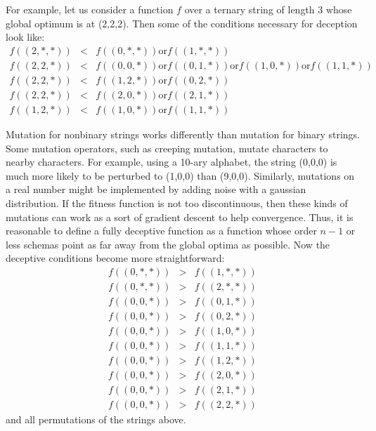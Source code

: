 For example, let us consider a function $f$ over a ternary string of length
3 whose global optimum is at (2,2,2).  Then some of the conditions necessary
for deception look like:
\begin{eqnarray}
f((2,*,*)) &<& f((0,*,*)) \mbox{or} f((1,*,*)) \nonumber\\
f((2,2,*)) &<& f((0,0,*)) \mbox{or} f((0,1,*)) \mbox{or} f((1,0,*)) \mbox{or} f((1,1,*)) \nonumber\\
f((2,2,*)) &<& f((1,2,*)) \mbox{or} f((0,2,*)) \nonumber \\
f((2,2,*)) &<& f((2,0,*)) \mbox{or} f((2,1,*)) \nonumber \\
f((1,2,*)) &<& f((1,0,*)) \mbox{or} f((1,1,*))
\end{eqnarray}

Mutation for nonbinary strings works differently than mutation for binary
strings.  Some mutation operators, such as creeping mutation, mutate
characters to nearby characters.  For example, using a 10-ary alphabet,
the string (0,0,0) is much more likely to be perturbed to (1,0,0) than (9,0,0).
Similarly, mutations on a real number might be implemented by adding noise
with a gaussian distribution.  If the fitness function is not too
discontinuous, then these kinds of mutations can work as a sort of gradient
descent to help convergence.  Thus, it is reasonable to define a fully
deceptive function as a function whose order $n-1$ or less schemas point as far
away from the global optima as possible.  Now the deceptive conditions
become more straightforward:
\begin{eqnarray}
f((0,*,*)) &>& f((1,*,*)) \nonumber\\
f((0,*,*)) &>& f((2,*,*)) \nonumber\\
f((0,0,*)) &>& f((0,1,*)) \nonumber\\ 
f((0,0,*)) &>& f((0,2,*)) \nonumber\\ 
f((0,0,*)) &>& f((1,0,*)) \nonumber\\ 
f((0,0,*)) &>& f((1,1,*)) \nonumber\\ 
f((0,0,*)) &>& f((1,2,*)) \nonumber\\
f((0,0,*)) &>& f((2,0,*)) \nonumber\\
f((0,0,*)) &>& f((2,1,*)) \nonumber\\
f((0,0,*)) &>& f((2,2,*))
\end{eqnarray} 
and all permutations of the strings above.

